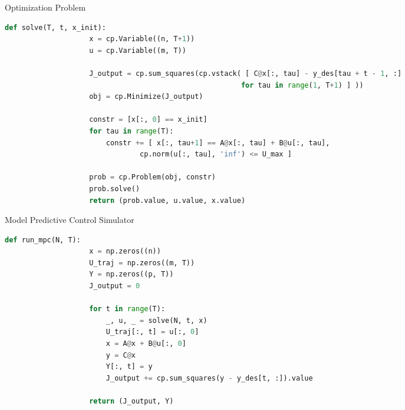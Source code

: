 \documentclass[12pt,reqno]{article}
\theoremstyle{definition}
\numberwithin{equation}{section}
\begin{document}
    \begin{algorithm}[htbp]
        \caption{Optimization Problem}
        \centering
            \begin{lstlisting}[language=Python]
                def solve(T, t, x_init):
                    x = cp.Variable((n, T+1))
                    u = cp.Variable((m, T))

                    J_output = cp.sum_squares(cp.vstack( [ C@x[:, tau] - y_des[tau + t - 1, :] 
                                                        for tau in range(1, T+1) ] ))
                    obj = cp.Minimize(J_output)

                    constr = [x[:, 0] == x_init]
                    for tau in range(T):
                        constr += [ x[:, tau+1] == A@x[:, tau] + B@u[:, tau],
                                cp.norm(u[:, tau], 'inf') <= U_max ]
                        
                    prob = cp.Problem(obj, constr)
                    prob.solve()
                    return (prob.value, u.value, x.value)
            \end{lstlisting}
        \label{alg:mpc-opt-problem}
    \end{algorithm}
    \begin{algorithm}[htbp]
        \caption{Model Predictive Control Simulator}
        \centering
            \begin{lstlisting}[language=Python]
                def run_mpc(N, T):
                    x = np.zeros((n))
                    U_traj = np.zeros((m, T))
                    Y = np.zeros((p, T))
                    J_output = 0
                    
                    for t in range(T):
                        _, u, _ = solve(N, t, x)
                        U_traj[:, t] = u[:, 0]
                        x = A@x + B@u[:, 0]
                        y = C@x
                        Y[:, t] = y
                        J_output += cp.sum_squares(y - y_des[t, :]).value

                    return (J_output, Y)
            \end{lstlisting}
        \label{alg:mpc-sim}
    \end{algorithm}
\end{document}
